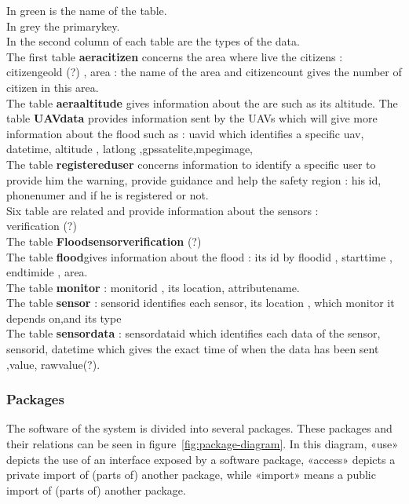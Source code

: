 In green is the name of the table. \\
In grey the primarykey. \\
In the second column of each table are the types of the data. \\

The first table \textbf{aeracitizen} concerns the area where live the citizens : citizengeold (?) , area : the name of the area and citizencount gives the number of citizen in this area.\\
The table \textbf{aeraaltitude} gives information about the are such as its altitude.
The table \textbf{UAVdata} provides information sent by the UAVs which will give more information about the flood such as : uavid which identifies a specific uav, datetime, altitude , latlong ,gpssatelite,mpegimage, \\
The table \textbf{registereduser} concerns information to identify a specific user to provide him the warning, provide guidance and help the safety region : his id, phonenumer and if he is registered or not. \\

Six table are related and provide information about the sensors : \\
verification (?) \\
The table \textbf{Floodsensorverification} (?) \\
The table \textbf{flood}gives information about the flood : its id by floodid , starttime , endtimide , area. \\
The table \textbf{monitor} : monitorid , its location, attributename. \\
The table \textbf{sensor} : sensorid identifies each sensor, its location , which monitor it depends on,and its type \\
The table \textbf{sensordata} : sensordataid which identifies each data of the sensor, sensorid, datetime which gives the exact time of when the data has been sent ,value,  rawvalue(?). 

\subsubsection{Packages}
The software of the system is divided into several packages. These packages and their relations can be seen in figure~\ref{fig:package-diagram}. 
In this diagram, «use» depicts the use of an interface exposed by a software package, «access» depicts a private import of (parts of) another package, while «import» means a public import of (parts of) another package. 

